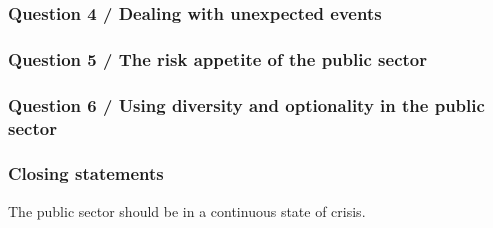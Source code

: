 \subsubsection{Question 4 / Dealing with unexpected events}

\subsubsection{Question 5 / The risk appetite of the public sector}

\subsubsection{Question 6 / Using diversity and optionality in the public sector}

\subsubsection{Closing statements}


The public sector should be in a continuous state of crisis.

